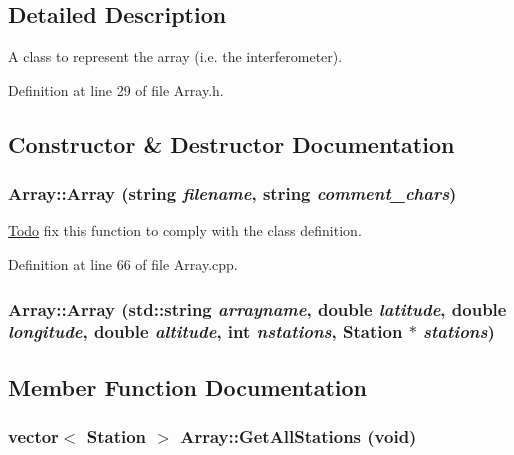 \subsection{Detailed Description}
A class to represent the array (i.e. the interferometer). 

Definition at line 29 of file Array.h.



\subsection{Constructor \& Destructor Documentation}
\hypertarget{classArray_a4a5d472a84870d72b3d67edec898bcfa}{
\subsubsection[{Array}]{\setlength{\rightskip}{0pt plus 5cm}Array::Array (string {\em filename}, \/  string {\em comment\_\-chars})}}
\label{classArray_a4a5d472a84870d72b3d67edec898bcfa}
\begin{Desc}
\item[\hyperlink{todo__todo000001}{Todo}]fix this function to comply with the class definition. \end{Desc}


Definition at line 66 of file Array.cpp.

\hypertarget{classArray_a535fa6f67112bdc50b3e3dc8fa5206a1}{
\subsubsection[{Array}]{\setlength{\rightskip}{0pt plus 5cm}Array::Array (std::string {\em arrayname}, \/  double {\em latitude}, \/  double {\em longitude}, \/  double {\em altitude}, \/  int {\em nstations}, \/  {\bf Station} $\ast$ {\em stations})}}
\label{classArray_a535fa6f67112bdc50b3e3dc8fa5206a1}


\subsection{Member Function Documentation}
\hypertarget{classArray_a07428a735386518eae0bb9ce08db8c02}{
\subsubsection[{GetAllStations}]{\setlength{\rightskip}{0pt plus 5cm}vector$<$ {\bf Station} $>$ Array::GetAllStations (void)}}
\label{classArray_a07428a735386518eae0bb9ce08db8c02}


